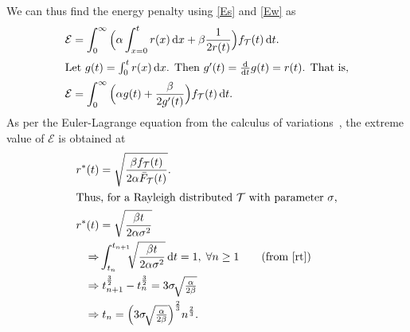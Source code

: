 We can thus find the energy penalty using \cref{Es} and \cref{Ew} as
\begin{alignat*}{1}
\mathcal{E}&=\int_{0}^{\infty}\Big(\alpha\int_{x=0}^{t}r(x)\,\mathrm{d}x+\beta\dfrac{1}{2r(t)}\Big)f_{\mathcal{T}}(t)\,\mathrm{d}t.\label{epsilon_eulerForm}\\
\intertext{Let $g(t)=\int_{0}^{t}r(x)\dif x$. Then  $g'(t)=\tfrac{\mathrm{d}}{\mathrm{d}t}g(t)=r(t)$. That is,}
\vspace{-4cm}\mathcal{E}&=\int_{0}^{\infty}\Big(\alpha g(t)+\dfrac{\beta}{2g'(t)}\Big)f_{\mathcal{T}}(t)\,\mathrm{d}t.
\end{alignat*}
As per the Euler-Lagrange equation from the calculus of variations~\cite{calcVariation2,calcVariation1}, the extreme value of $\mathcal{E}$ is obtained at 
\begin{alignat}{1}
r^*(t)&=\sqrt{\dfrac{\beta f_\mathcal{T}(t)}{2\alpha\bar{F}_\mathcal{T}(t)}}.\\
\intertext{Thus, for a Rayleigh distributed $\mathcal{T}$ with parameter $\sigma$,}
r^*(t)&=\sqrt{\dfrac{\beta t}{2\alpha\sigma^2}}\\
\Rightarrow &\int_{t_n}^{t_{n+1}}\!\!\!\sqrt{\dfrac{\beta t}{2\alpha\sigma^2}}\,\mathrm{d}t=1,\;\forall n\geq1\nonumber\tag{from \eqref{rt}}\\
\Rightarrow &\;t_{n+1}^{\frac{3}{2}}-t_{n}^{\frac{3}{2}}=3\sigma\!\sqrt{\tfrac{\alpha}{2\beta}}\nonumber\\
\Rightarrow &\;t_n=\Big(3\sigma\!\sqrt{\tfrac{\alpha}{2\beta}}\Big)^{\frac{2}{3}}n^{\frac{2}{3}}.
\end{alignat}
